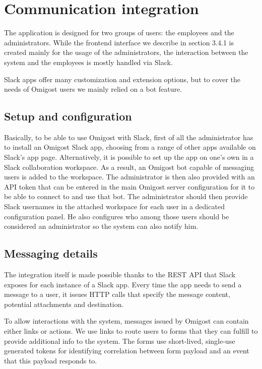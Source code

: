 \documentclass[licencjacka,en]{thesisclass}
\begin{document}
    \section{Communication integration}
    The application is designed for two groups of users: the employees and the administrators.
    While the frontend interface we describe in section 3.4.1 is created mainly for the usage
    of the administrators, the interaction between the system and the employees is mostly
    handled via Slack.

    Slack apps offer many customization and extension options, but to cover
    the needs of Omigost users we mainly relied on a bot feature.

    \subsection{Setup and configuration}

    Basically, to be able to use Omigost with Slack, first of all the administrator
    has to install an Omigost Slack app, choosing from a range of other apps
    available on Slack's app page.
    Alternatively, it is possible to set up the app on one's own
    in a Slack collaboration workspace.
    As a result, an Omigost bot capable of messaging users is added to the workspace.
    The administrator is then also provided with an API token that can be entered in
    the main Omigost server configuration for it to be able
    to connect to and use that bot.
    The administrator should then provide Slack usernames in the attached
    workspace for each user in a dedicated configuration panel.
    He also configures who among those users should be considered an administrator
    so the system can also notify him.

    \subsection{Messaging details}

    The integration itself is made possible thanks to the REST API
    that Slack exposes for each instance of a Slack app.
    Every time the app needs to send a message to a user, it issues HTTP
    calls that specify the message content, potential attachments and destination.

    To allow interactions with the system, messages issued by Omigost
    can contain either links or actions.
    We use links to route users to forms that they can fulfill
    to provide additional info to the system.
    The forms use short-lived, single-use generated tokens for identifying
    correlation between form payload and an event that this payload responds to.
\end{document}

